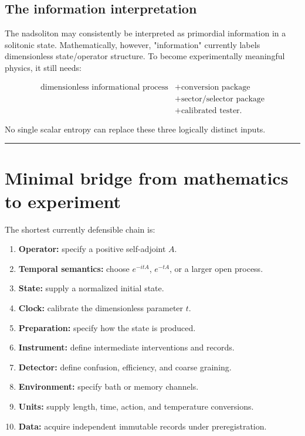 \documentclass[11pt,a4paper,openany]{report}
\begin{document}
\section{The information interpretation}

The nadsoliton may consistently be interpreted as primordial information in a solitonic state. Mathematically, however, "information" currently labels dimensionless state/\allowbreak{}operator structure. To become experimentally meaningful physics, it still needs:

\[
\begin{aligned}
\text{dimensionless informational process}
&+\text{conversion package}\\
&+\text{sector/selector package}\\
&+\text{calibrated tester}.
\end{aligned}
\]

No single scalar entropy can replace these three logically distinct inputs.

\par\medskip\hrule\medskip

\chapter{Minimal bridge from mathematics to experiment}

The shortest currently defensible chain is:

\begin{enumerate}
\item 
\textbf{Operator:} specify a positive self-adjoint \(A\).

\item 
\textbf{Temporal semantics:} choose \(e^{-itA}\), \(e^{-tA}\), or a larger open process.

\item 
\textbf{State:} supply a normalized initial state.

\item 
\textbf{Clock:} calibrate the dimensionless parameter \(t\).

\item 
\textbf{Preparation:} specify how the state is produced.

\item 
\textbf{Instrument:} define intermediate interventions and records.

\item 
\textbf{Detector:} define confusion, efficiency, and coarse graining.

\item 
\textbf{Environment:} specify bath or memory channels.

\item 
\textbf{Units:} supply length, time, action, and temperature conversions.

\item 
\textbf{Data:} acquire independent immutable records under preregistration.

\end{enumerate}
\end{document}
